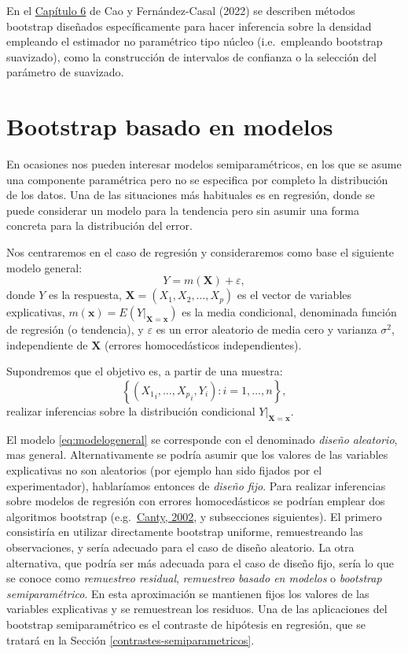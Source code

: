\documentclass[
  10pt,
]{book}
\renewcommand{\mathbf}[1]{\symbf{#1}}
\theoremstyle{break}
\theoremstyle{nonumberplain}
\begin{document}
En el \href{https://rubenfcasal.github.io/book_remuestreo/npden.html}{Capítulo 6} de Cao y Fernández-Casal (2022) se describen métodos bootstrap diseñados específicamente para hacer inferencia sobre la densidad empleando el estimador no paramétrico tipo núcleo (i.e.~empleando bootstrap suavizado), como la construcción de intervalos de confianza o la selección del parámetro de suavizado.

\hypertarget{boot-reg}{%
\section{Bootstrap basado en modelos}\label{boot-reg}}

En ocasiones nos pueden interesar modelos semiparamétricos, en los que se asume una componente paramétrica pero no se especifica por completo la distribución de los datos.
Una de las situaciones más habituales es en regresión, donde se puede considerar un modelo para la tendencia pero sin asumir una forma concreta para la distribución del error.

Nos centraremos en el caso de regresión y consideraremos como base el siguiente modelo general:
\begin{equation} 
  Y = m(\mathbf{X}) + \varepsilon,
  \label{eq:modelogeneral}
\end{equation}
donde \(Y\) es la respuesta, \(\mathbf{X}=(X_1, X_2, \ldots, X_p)\) es el vector de variables explicativas, \(m(\mathbf{x}) = E\left( \left. Y\right\vert_{\mathbf{X}=\mathbf{x}} \right)\) es la media condicional, denominada función de regresión (o tendencia), y \(\varepsilon\) es un error aleatorio de media cero y varianza \(\sigma^2\), independiente de \(\mathbf{X}\) (errores homocedásticos independientes).

Supondremos que el objetivo es, a partir de una muestra:
\[\left\{ \left( {X_1}_i, \ldots, {X_p}_i, Y_{i} \right)  : i = 1, \ldots, n \right\},\]
realizar inferencias sobre la distribución condicional
\(\left.Y \right\vert_{\mathbf{X}=\mathbf{x}}\).

El modelo \eqref{eq:modelogeneral} se corresponde con el denominado \emph{diseño aleatorio}, mas general.
Alternativamente se podría asumir que los valores de las variables explicativas no son aleatorios (por ejemplo han sido fijados por el experimentador), hablaríamos entonces de \emph{diseño fijo}.
Para realizar inferencias sobre modelos de regresión con errores homocedásticos se podrían emplear dos algoritmos bootstrap (e.g.~\href{http://cran.fhcrc.org/doc/Rnews/Rnews_2002-3.pdf}{Canty, 2002}, y subsecciones siguientes).
El primero consistiría en utilizar directamente bootstrap uniforme, remuestreando las observaciones, y sería adecuado para el caso de diseño aleatorio.
La otra alternativa, que podría ser más adecuada para el caso de diseño fijo, sería lo que se conoce como \emph{remuestreo residual}, \emph{remuestreo basado en modelos} o \emph{bootstrap semiparamétrico}.
En esta aproximación se mantienen fijos los valores de las variables explicativas y se remuestrean los residuos.
Una de las aplicaciones del bootstrap semiparamétrico es el contraste de hipótesis en regresión, que se tratará en la Sección \ref{contrastes-semiparametricos}.
\end{document}
